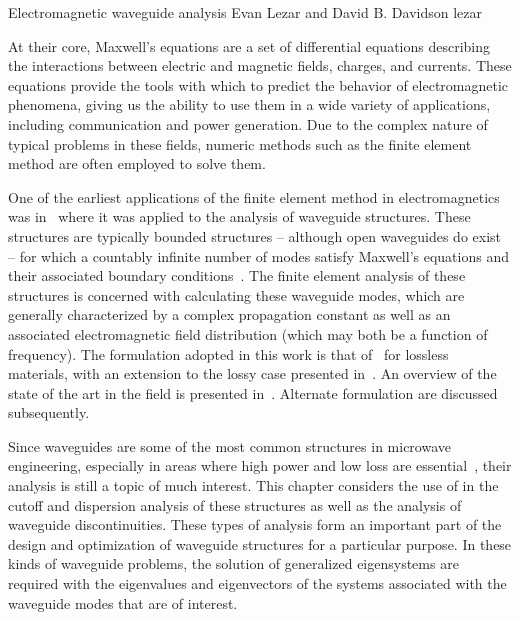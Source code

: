               {Electromagnetic waveguide analysis}
              {Evan Lezar and David B. Davidson}
              {lezar}

At their core, Maxwell's equations are a set of differential equations describing the interactions between electric and magnetic fields, charges, and currents. These equations provide the tools with which to predict the behavior of electromagnetic phenomena, giving us the ability to use them in a wide variety of applications, including communication and power generation. Due to the complex nature of typical problems in these fields, numeric methods such as the finite element method are often employed to solve them.

One of the earliest applications of the finite element method in electromagnetics was in~\citet{Silvester1969} where it was applied to the analysis of waveguide structures. These structures are typically bounded structures -- although open waveguides do exist -- for which a countably infinite number of modes satisfy Maxwell's equations and their associated boundary conditions~\citep{Pozar2005}. The finite element analysis of these structures is concerned with calculating these waveguide modes, which are generally characterized by a complex propagation constant as well as an associated electromagnetic field distribution (which may both be a function of frequency). The formulation adopted in this work is that of~\citet{LeeSunCendes1991} for lossless materials, with an extension to the lossy case presented in~\citet{Lee1994}. An overview of the state of the art in the field is presented in~\citet{Davidson2011}. Alternate formulation are discussed subsequently. 

Since waveguides are some of the most common structures in microwave engineering, especially in areas where high power and low loss are essential~\citep{Pozar2005}, their analysis is still a topic of much interest. This chapter considers the use of \fenics{} in the cutoff and dispersion analysis of these structures as well as the analysis of waveguide discontinuities. These types of analysis form an important part of the design and optimization of waveguide structures for a particular purpose. In these kinds of waveguide problems, the solution of generalized eigensystems are required with the eigenvalues and eigenvectors of the systems associated with the waveguide modes that are of interest.

